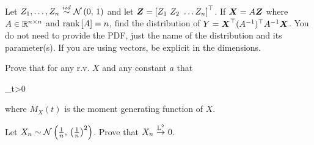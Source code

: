 \documentclass[12pt]{article}
\begin{document}
 Let $\Zoneton \iid \stdnormnot$ and let $\boldsymbol{Z} = \left[Z_1 ~ Z_2 ~ \ldots Z_n\right]^\top$. If $\boldsymbol{X} = A\boldsymbol{Z}$ where $A \in \mathbb{R}^{n \times n}$ and $\text{rank}\left[A\right] = n$, find the distribution of $Y = \boldsymbol{X}^\top (A^{-1})^\top A^{-1} \boldsymbol{X}$. You do not need to provide the PDF, just the name of the distribution and its parameter(s). If you are using vectors, be explicit in the dimensions.  


 Prove that for any r.v. $X$ and any constant $a$ that 

\beqn
{} \leq \min_{t>0} 
\eeqn

where $M_X(t)$ is the moment generating function of $X$.  


 Let $X_n \sim \mathcal{N}\left(\frac{1}{n},\,\left(\frac{1}{n}\right)^2\right)$. Prove that $X_n \convLp{2} 0$.   


\eenum
\end{document}
